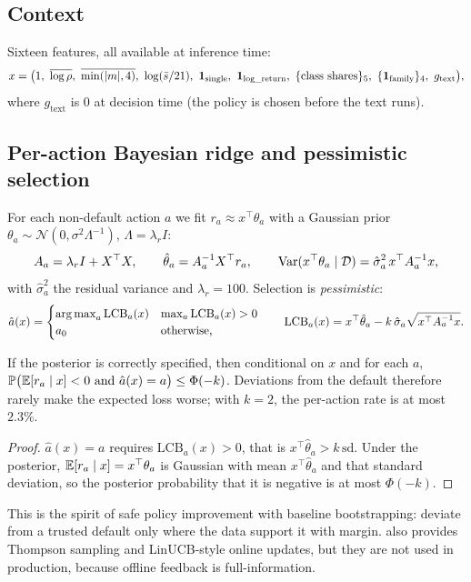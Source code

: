 \subsection{Context}

Sixteen features, all available at inference time:
\begin{equation}
  x=\bigl(1,\ \overline{\log\rho},\ \overline{\min(|m|,4)},\ \log(\bar s/21),\ \ind_{\text{single}},\ \ind_{\text{log\_return}},\
  \{\text{class shares}\}_{5},\ \{\ind_{\text{family}}\}_{4},\ g_{\text{text}}\bigr),
\end{equation}
where $g_{\text{text}}$ is $0$ at decision time (the policy is chosen before the text runs).

\subsection{Per-action Bayesian ridge and pessimistic selection}

For each non-default action $a$ we fit $r_a\approx x^\top\theta_a$ with a Gaussian prior $\theta_a\sim\mathcal N(0,\sigma^2\Lambda^{-1})$,
$\Lambda=\lambda_rI$:
\begin{equation}
  A_a=\lambda_rI+X^\top X,\qquad \hat\theta_a=A_a^{-1}X^\top r_a,\qquad \operatorname{Var}(x^\top\theta_a\mid\mathcal D)=\hat\sigma^2_a\,x^\top A_a^{-1}x,
\end{equation}
with $\hat\sigma^2_a$ the residual variance and $\lambda_r=100$. Selection is \emph{pessimistic}:
\begin{equation}\label{eq:lcb}
  \hat a(x)=\begin{cases}\operatorname*{arg\,max}_a\mathrm{LCB}_a(x) & \max_a\mathrm{LCB}_a(x)>0\\ a_0 & \text{otherwise,}\end{cases}\qquad
  \mathrm{LCB}_a(x)=x^\top\hat\theta_a-k\,\hat\sigma_a\sqrt{x^\top A_a^{-1}x}.
\end{equation}

\begin{proposition}\label{prop:safe}
If the posterior is correctly specified, then conditional on $x$ and for each $a$, $\mathbb{P}\bigl(\mathbb{E}[r_a\mid x]<0\ \text{and}\ \hat a(x)=a\bigr)\le\Phi(-k)$.
Deviations from the default therefore rarely make the expected loss worse; with $k=2$, the per-action rate is at most $2.3\%$.
\end{proposition}
\begin{proof}
$\hat a(x)=a$ requires $\mathrm{LCB}_a(x)>0$, that is $x^\top\hat\theta_a>k\,\mathrm{sd}$. Under the posterior, $\mathbb{E}[r_a\mid x]=x^\top\theta_a$ is
Gaussian with mean $x^\top\hat\theta_a$ and that standard deviation, so the posterior probability that it is negative is at most $\Phi(-k)$.
\end{proof}
This is the spirit of safe policy improvement with baseline bootstrapping: deviate from a trusted default only where the data support it with
margin. \code{LinearArm} also provides Thompson sampling and LinUCB-style online updates, but they are not used in production, because offline
feedback is full-information.

